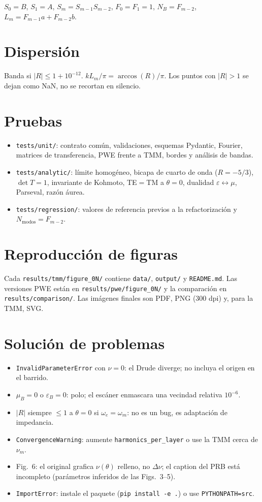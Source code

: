 \documentclass[11pt,a4paper]{article}
\begin{document}
$S_0=B$, $S_1=A$, $S_m=S_{m-1}S_{m-2}$, $F_0=F_1=1$,
$N_B=F_{m-2}$, $L_m=F_{m-1}a+F_{m-2}b$.

\section{Dispersión}

Banda si $\lvert R\rvert\le 1+10^{-12}$. $kL_m/\pi=\arccos(R)/\pi$.
Los puntos con $\lvert R\rvert>1$ se dejan como NaN, no se recortan en silencio.

\section{Pruebas}

\begin{itemize}
\item \texttt{tests/unit/}: contrato común, validaciones, esquemas Pydantic,
Fourier, matrices de transferencia, PWE frente a TMM, bordes y análisis de bandas.
\item \texttt{tests/analytic/}: límite homogéneo, bicapa de cuarto de onda
($R=-5/3$), $\det T=1$, invariante de Kohmoto, TE$=$TM a $\theta=0$,
dualidad $\varepsilon\leftrightarrow\mu$, Parseval, razón áurea.
\item \texttt{tests/regression/}: valores de referencia previos a la
refactorización y $N_{\mathrm{modos}}=F_{m-2}$.
\end{itemize}

\section{Reproducción de figuras}

Cada \texttt{results/tmm/figure\_0N/} contiene \texttt{data/}, \texttt{output/} y
\texttt{README.md}. Las versiones PWE están en \texttt{results/pwe/figure\_0N/} y
la comparación en \texttt{results/comparison/}. Las imágenes finales son PDF,
PNG (300 dpi) y, para la TMM, SVG.

\section{Solución de problemas}

\begin{itemize}
\item \texttt{InvalidParameterError} con $\nu=0$: el Drude diverge; no incluya el origen en el barrido.
\item $\mu_B=0$ o $\varepsilon_B=0$: polo; el escáner enmascara una vecindad relativa $10^{-6}$.
\item $\lvert R\rvert$ siempre $\le 1$ a $\theta=0$ si $\omega_e=\omega_m$: no es un bug, es adaptación de impedancia.
\item \texttt{ConvergenceWarning}: aumente \texttt{harmonics\_per\_layer} o use la TMM cerca de $\nu_m$.
\item Fig.~6: el original grafica $\nu(\theta)$ relleno, no $\Delta\nu$;
el caption del PRB está incompleto (parámetros inferidos de las Figs.~3--5).
\item \texttt{ImportError}: instale el paquete (\texttt{pip install -e .}) o use \texttt{PYTHONPATH=src}.
\end{itemize}
\end{document}
